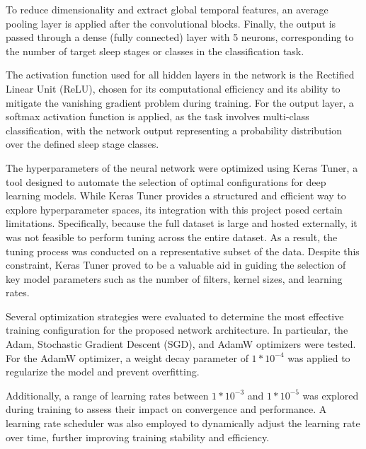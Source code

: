 To reduce dimensionality and extract global temporal features, an average pooling layer is applied after the convolutional blocks. Finally, the output is passed through a dense (fully connected) layer with 5 neurons, corresponding to the number of target sleep stages or classes in the classification task.

The activation function used for all hidden layers in the network is the Rectified Linear Unit (ReLU), chosen for its computational efficiency and its ability to mitigate the vanishing gradient problem during training. For the output layer, a softmax activation function is applied, as the task involves multi-class classification, with the network output representing a probability distribution over the defined sleep stage classes.

The hyperparameters of the neural network were optimized using Keras Tuner, a tool designed to automate the selection of optimal configurations for deep learning models. While Keras Tuner provides a structured and efficient way to explore hyperparameter spaces, its integration with this project posed certain limitations. Specifically, because the full dataset is large and hosted externally, it was not feasible to perform tuning across the entire dataset. As a result, the tuning process was conducted on a representative subset of the data. Despite this constraint, Keras Tuner proved to be a valuable aid in guiding the selection of key model parameters such as the number of filters, kernel sizes, and learning rates.

Several optimization strategies were evaluated to determine the most effective training configuration for the proposed network architecture. In particular, the Adam, Stochastic Gradient Descent (SGD), and AdamW optimizers were tested. For the AdamW optimizer, a weight decay parameter of \(1*10^{-4}\) was applied to regularize the model and prevent overfitting.

Additionally, a range of learning rates between \(1*10^{-3}\) and \(1*10^{-5}\) was explored during training to assess their impact on convergence and performance. A learning rate scheduler was also employed to dynamically adjust the learning rate over time, further improving training stability and efficiency.


